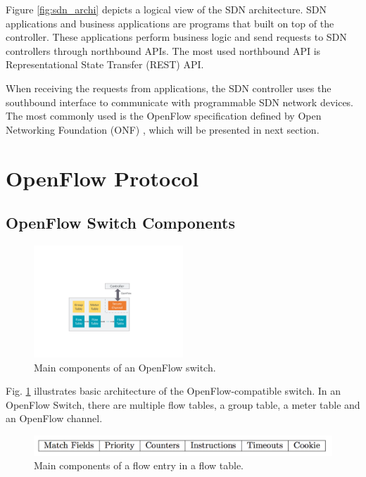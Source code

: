 Figure \ref{fig:sdn_archi} depicts a logical view of the SDN architecture.
SDN applications and business applications are programs that built on top of the controller.
These applications perform business logic and send requests to SDN controllers through northbound APIs.
The most used northbound API is Representational State Transfer (REST) API.

When receiving the requests from applications, the SDN controller uses the southbound interface to communicate with programmable SDN network devices.
The most commonly used is the OpenFlow specification \cite{openflow-spec} defined by Open Networking Foundation (ONF) \cite{onf}, which will be presented in next section.





\section{OpenFlow Protocol} \label{sec:openflow}
\subsection{OpenFlow Switch Components}

\begin{figure}[!t]
\centering
\includegraphics[width=0.5\textwidth]{./fig/openflow_switch_component}
\caption{Main components of an OpenFlow switch. \cite{openflow-spec}}
\label{fig:openflow_switch_component}
\end{figure}

Fig. \ref{fig:openflow_switch_component} illustrates basic architecture of the OpenFlow-compatible switch. In an OpenFlow Switch, there are multiple flow tables, a group table, a meter table and an OpenFlow channel.

\begin{figure}[!t]
\centering
\includegraphics[width=\textwidth]{./fig/flow_entry}
\caption{Main components of a flow entry in a flow table. \cite{openflow-spec}}
\label{fig:flow_entry}
\end{figure}

